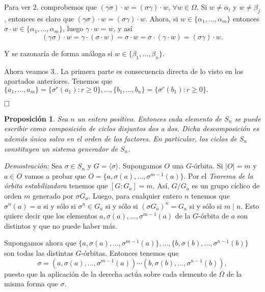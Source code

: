 \documentclass[12pt]{article}
\newtheorem{proposition}[theorem]{Proposición}
\begin{document}
Para ver $2.$ comprobemos que $(\gamma \sigma) \cdot w = (\sigma \gamma) \cdot w$, $\forall w \in \Omega$. Si $w \neq \alpha_i$ y $w \neq \beta_j$, entonces es claro que $(\gamma \sigma) \cdot w = (\sigma \gamma) \cdot w$. Ahora, si $w \in \lbrace \alpha_1, \ldots, \alpha_m \rbrace$ entonces $\sigma \cdot w \in \lbrace \alpha_1, \ldots, \alpha_m \rbrace$, luego $\gamma \cdot w = w$, y así $$(\gamma \sigma) \cdot w = \gamma \cdot (\sigma \cdot w) = \sigma \cdot w = \sigma \cdot (\gamma \cdot w) = (\sigma \gamma) \cdot w.$$

Y se razonaría de forma análoga si $w \in \lbrace \beta_1, \ldots, \beta_n \rbrace$.

Ahora veamos $3.$. La primera parte es consecuencia directa de lo visto en los apartados anteriores. Tenemos que $\lbrace a_{1}, \ldots, a_{m} \rbrace = \lbrace \sigma^{r}(a_{1}) : r \geq 0 \rbrace, \ldots, \lbrace b_{1}, \ldots, b_{n} \rbrace = \lbrace \sigma^{r}(b_{1}) : r \geq 0 \rbrace.$

$\hfill \square$

\begin{proposition}\label{eq:ciclosdis} Sea $n$ un entero positivo. Entonces cada elemento de $S_{n}$ se puede escribir como composición de ciclos disjuntos dos a dos. Dicha descomposición es además única salvo en el orden de los factores. En particular, los ciclos de $S_{n}$ constituyen un sistema generador de $S_{n}$.
\end{proposition}
\emph{Demostración: } 
Sea $\sigma \in S_{n}$ y $G= \langle \sigma \rangle$. Supongamos $O$ una $G$-órbita. Si $|O| = m$ y $a \in O$ vamos a probar que $O = \lbrace a, \sigma(a), \ldots, \sigma^{m-1}(a) \rbrace$. Por el \textit{Teorema de la órbita estabilizadora} tenemos que $[G:G_{a}] = m$. Así, $G/G_{a}$ es un grupo cíclico de orden $m$ generado por $\sigma G_{a}$. Luego, para cualquier entero $n$ tenemos que $\sigma^{n}(a) = a$ si y sólo si $\sigma^{n}\in G_{a}$ si y sólo si $(\sigma G_{a})^{n} = G_{a}$ si y sólo si $m \mid n$. Esto quiere decir que los elementos $a, \sigma(a), \ldots, \sigma^{m-1}(a)$ de la $G$-órbita de $a$ son distintos y que no puede haber más.

Supongamos ahora que $\lbrace a, \sigma(a), \ldots, \sigma^{m-1}(a) \rbrace, \ldots, \lbrace b, \sigma(b), \ldots, \sigma^{n-1}(b) \rbrace$ son todas las distintas $G$-órbitas. Entonces tenemos que $$\sigma = (a, \sigma(a), \ldots, \sigma^{m-1}(a))\cdots (b, \sigma(b), \ldots, \sigma^{n-1}(b)),$$ puesto que la aplicación de la derecha actúa sobre cada elemento de $\Omega$ de la misma forma que $\sigma$.
\end{document}
